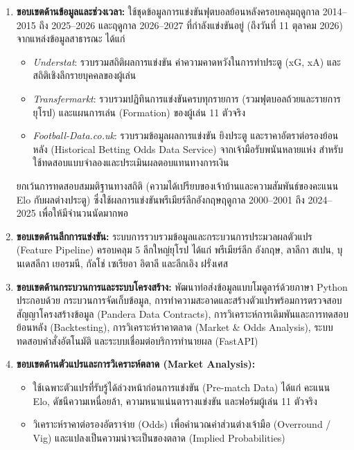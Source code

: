 \begin{enumerate}[label=\arabic*)]
    \item \textbf{ขอบเขตด้านข้อมูลและช่วงเวลา:} ใช้ชุดข้อมูลการแข่งขันฟุตบอลย้อนหลังครอบคลุมฤดูกาล 2014--2015 ถึง 2025--2026 และฤดูกาล 2026--2027 ที่กำลังแข่งขันอยู่ (ถึงวันที่ 11 ตุลาคม 2026) จากแหล่งข้อมูลสาธารณะ ได้แก่
    \begin{itemize}
        \item \textit{Understat}: รวบรวมสถิติผลการแข่งขัน ค่าความคาดหวังในการทำประตู (xG, xA) และสถิติเชิงลึกรายบุคคลของผู้เล่น \cite{understat2024}
        \item \textit{Transfermarkt}: รวบรวมปฏิทินการแข่งขันครบทุกรายการ (รวมฟุตบอลถ้วยและรายการยุโรป) และแผนการเล่น (Formation) ของผู้เล่น 11 ตัวจริง \cite{transfermarkt2024}
        \item \textit{Football-Data.co.uk}: รวบรวมข้อมูลผลการแข่งขัน ยิงประตู และราคาอัตราต่อรองย้อนหลัง (Historical Betting Odds Data Service) จากเจ้ามือรับพนันหลายแห่ง สำหรับใช้ทดสอบแบบจำลองและประเมินผลตอบแทนทางการเงิน
    \end{itemize}
    ยกเว้นการทดสอบสมมติฐานทางสถิติ (ความได้เปรียบของเจ้าบ้านและความสัมพันธ์ของคะแนน Elo กับผลต่างประตู) ซึ่งใช้ผลการแข่งขันพรีเมียร์ลีกอังกฤษฤดูกาล 2000--2001 ถึง 2024--2025 เพื่อให้มีจำนวนนัดมากพอ

    \item \textbf{ขอบเขตด้านลีกการแข่งขัน:} ระบบการรวบรวมข้อมูลและกระบวนการประมวลผลตัวแปร (Feature Pipeline) ครอบคลุม 5 ลีกใหญ่ยุโรป ได้แก่ พรีเมียร์ลีก อังกฤษ, ลาลีกา สเปน, บุนเดสลีกา เยอรมนี, กัลโช่ เซเรียอา อิตาลี และลีกเอิง ฝรั่งเศส

    \item \textbf{ขอบเขตด้านกระบวนการและระบบโครงสร้าง:} พัฒนาท่อส่งข้อมูลแบบโมดูลาร์ด้วยภาษา Python ประกอบด้วย กระบวนการจัดเก็บข้อมูล, การทำความสะอาดและสร้างตัวแปรพร้อมการตรวจสอบสัญญาโครงสร้างข้อมูล (Pandera Data Contracts), การวิเคราะห์การเดิมพันและการทดสอบย้อนหลัง (Backtesting), การวิเคราะห์ราคาตลาด (Market \& Odds Analysis), ระบบทดสอบคำสั่งอัตโนมัติ และระบบเชื่อมต่อบริการทำนายผล (FastAPI)

    \item \textbf{ขอบเขตด้านตัวแปรและการวิเคราะห์ตลาด (Market Analysis):}
    \begin{itemize}
        \item ใช้เฉพาะตัวแปรที่รับรู้ได้ล่วงหน้าก่อนการแข่งขัน (Pre-match Data) ได้แก่ คะแนน Elo, ดัชนีความเหนื่อยล้า, ความหนาแน่นตารางแข่งขัน และฟอร์มผู้เล่น 11 ตัวจริง
        \item วิเคราะห์ราคาต่อรองอัตราจ่าย (Odds) เพื่อคำนวณค่าส่วนต่างเจ้ามือ (Overround / Vig) และแปลงเป็นความน่าจะเป็นของตลาด (Implied Probabilities)
    \end{itemize}


\end{enumerate}
